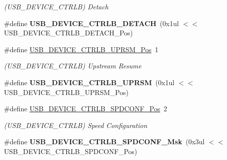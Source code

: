 \begin{DoxyCompactItemize}
\begin{DoxyCompactList}\small\item\em (U\+S\+B\+\_\+\+D\+E\+V\+I\+C\+E\+\_\+\+C\+T\+R\+L\+B) Detach \end{DoxyCompactList}\item 
\hypertarget{group___s_a_m_l21___u_s_b_gad4d46a1d9d15b8dfad805101df8d4968}{}\#define {\bfseries U\+S\+B\+\_\+\+D\+E\+V\+I\+C\+E\+\_\+\+C\+T\+R\+L\+B\+\_\+\+D\+E\+T\+A\+C\+H}~(0x1ul $<$$<$ U\+S\+B\+\_\+\+D\+E\+V\+I\+C\+E\+\_\+\+C\+T\+R\+L\+B\+\_\+\+D\+E\+T\+A\+C\+H\+\_\+\+Pos)\label{group___s_a_m_l21___u_s_b_gad4d46a1d9d15b8dfad805101df8d4968}

\item 
\hypertarget{group___s_a_m_l21___u_s_b_gab93be7942d56b8a9b058a68210fc8564}{}\#define \hyperlink{group___s_a_m_l21___u_s_b_gab93be7942d56b8a9b058a68210fc8564}{U\+S\+B\+\_\+\+D\+E\+V\+I\+C\+E\+\_\+\+C\+T\+R\+L\+B\+\_\+\+U\+P\+R\+S\+M\+\_\+\+Pos}~1\label{group___s_a_m_l21___u_s_b_gab93be7942d56b8a9b058a68210fc8564}

\begin{DoxyCompactList}\small\item\em (U\+S\+B\+\_\+\+D\+E\+V\+I\+C\+E\+\_\+\+C\+T\+R\+L\+B) Upstream Resume \end{DoxyCompactList}\item 
\hypertarget{group___s_a_m_l21___u_s_b_ga5082e4a3546109b3e4a120c74b7b66d4}{}\#define {\bfseries U\+S\+B\+\_\+\+D\+E\+V\+I\+C\+E\+\_\+\+C\+T\+R\+L\+B\+\_\+\+U\+P\+R\+S\+M}~(0x1ul $<$$<$ U\+S\+B\+\_\+\+D\+E\+V\+I\+C\+E\+\_\+\+C\+T\+R\+L\+B\+\_\+\+U\+P\+R\+S\+M\+\_\+\+Pos)\label{group___s_a_m_l21___u_s_b_ga5082e4a3546109b3e4a120c74b7b66d4}

\item 
\hypertarget{group___s_a_m_l21___u_s_b_gab5b9688f10e2ab8aa52f42628139b6eb}{}\#define \hyperlink{group___s_a_m_l21___u_s_b_gab5b9688f10e2ab8aa52f42628139b6eb}{U\+S\+B\+\_\+\+D\+E\+V\+I\+C\+E\+\_\+\+C\+T\+R\+L\+B\+\_\+\+S\+P\+D\+C\+O\+N\+F\+\_\+\+Pos}~2\label{group___s_a_m_l21___u_s_b_gab5b9688f10e2ab8aa52f42628139b6eb}

\begin{DoxyCompactList}\small\item\em (U\+S\+B\+\_\+\+D\+E\+V\+I\+C\+E\+\_\+\+C\+T\+R\+L\+B) Speed Configuration \end{DoxyCompactList}\item 
\hypertarget{group___s_a_m_l21___u_s_b_gac9185a57c892384a6a0be4ef054d928c}{}\#define {\bfseries U\+S\+B\+\_\+\+D\+E\+V\+I\+C\+E\+\_\+\+C\+T\+R\+L\+B\+\_\+\+S\+P\+D\+C\+O\+N\+F\+\_\+\+Msk}~(0x3ul $<$$<$ U\+S\+B\+\_\+\+D\+E\+V\+I\+C\+E\+\_\+\+C\+T\+R\+L\+B\+\_\+\+S\+P\+D\+C\+O\+N\+F\+\_\+\+Pos)\label{group___s_a_m_l21___u_s_b_gac9185a57c892384a6a0be4ef054d928c}


\end{DoxyCompactItemize}
